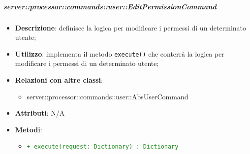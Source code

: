         \subparagraph{server::processor::commands::user::EditPermissionCommand} %
        \label{subp:bdsm_app_server_processor_commands_user_editpermissioncommand}
        \begin{itemize}
          \item \textbf{Descrizione}: definisce la logica per modificare i permessi di un determinato utente;
          \item \textbf{Utilizzo}: implementa il metodo \texttt{execute()} che conterrà la logica per modificare i permessi di un determinato utente;
          \item \textbf{Relazioni con altre classi}:
            \begin{itemize}
              \item server::processor::commands::user::AbsUserCommand
            \end{itemize}
          \item \textbf{Attributi}: N/A
          \item \textbf{Metodi}:
          \begin{itemize}
              \item \textcolor{forestgreen}{\texttt{+ execute(request: Dictionary) : Dictionary}}
          \end{itemize}
        \end{itemize}

